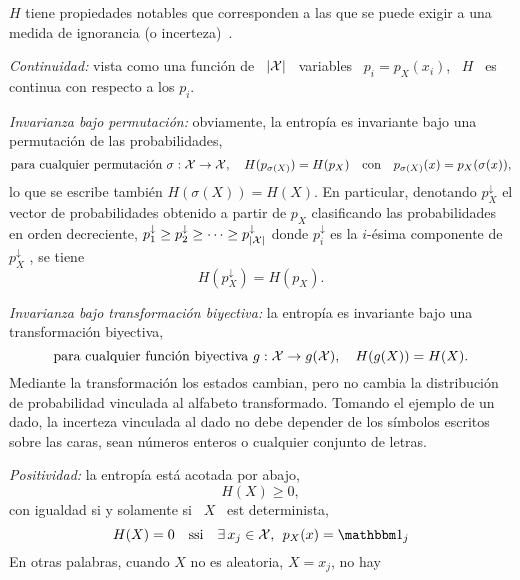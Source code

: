  $H$ tiene propiedades notables que corresponden
a las que se puede exigir  a una medida de ignorancia (o incerteza)~\cite{Sha48,
  ShaWea64, CovTho06, Rio07, DemCov91, Joh04}.
%
\begin{propiedades}
\item\label{Prop:SZ:continuidad} {\it Continuidad:}  vista como una funci\'on de
  \ $|\mathcal{X}|$ \ variables  \ $p_i = p_X(x_i)$, \ $H$ \  es continua con respecto a
  los $p_i$.
%
\setcounter{PropPermutacion}{\value{enumi}}
\item\label{Prop:SZ:permutacion}   {\it  Invarianza bajo   permutaci\'on:}
  obviamente,  la  entrop\'ia  es  invariante  bajo  una  permutaci\'on  de  las
  probabilidades, \ie
  \[
  \mbox{para   cualquier   permutaci\'on   }   \sigma:   \mathcal{X}   \to   \mathcal{X},   \quad
  H(p_{\sigma(X)})   =  H(p_X)   \quad  \mbox{con}   \quad   p_{\sigma(X)}(x)  =
  p_X(\sigma(x)),
  \]
  lo que se escribe tambi\'en $H(\sigma(X)) = H(X)$.  En particular, denotando
  $p_X^\downarrow$  el  vector de  probabilidades  obtenido  a partir  de  $p_X$
  clasificando  las probabilidades  en  orden  decreciente, $p_1^\downarrow  \ge
  p_2^\downarrow \ge  \cdots \ge p_{|\mathcal{X}|}^\downarrow$ donde  $p_i^\downarrow$ es
  la     $i$-\'esima     componente      de     $p_X^\downarrow$     ,
  se tiene
  \[
  H(p_X^\downarrow) = H(p_X).
  \]
%
\setcounter{PropBiyeccion}{\value{enumi}}
\item\label{Prop:SZ:biyeccion}   {\it  Invarianza   bajo   transformaci\'on
    biyectiva:}   la  entrop\'ia   es  invariante   bajo  una   transformaci\'on
  biyectiva, \ie
  \[
  \mbox{para cualquier  funci\'on biyectiva } g:  \mathcal{X} \to g(\mathcal{X}),  \quad H(g(X)) =
  H(X).
  \]
  Mediante  la  transformaci\'on  los  estados  cambian,  pero  no  cambia  la
  distribuci\'on de probabilidad vinculada al alfabeto transformado.  Tomando el
  ejemplo de  un dado, la  incerteza vinculada al dado  no debe depender  de los
  s\'imbolos  escritos  sobre las  caras,  sean  n\'umeros enteros  o  cualquier
  conjunto de letras.
%
\item\label{Prop:SZ:positividad} {\it Positividad:} la entrop\'ia est\'a acotada por abajo,
  \[
  H(X) \ge 0,
  \]
  con igualdad si y solamente si \ $X$ \ est determinista, \ie
  \[
  H(X)  =  0 \quad  \mbox{ssi}  \quad \exists \, x_j \in \X, \:\: p_X(x) = \uno_j
  \]
  En  otras palabras,  cuando $X$  no  es aleatoria,  \ie  $X =  x_j$, no  hay

\end{propiedades}
